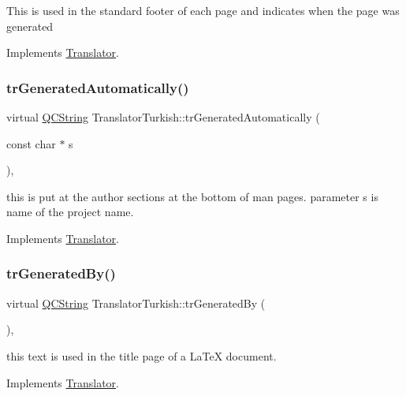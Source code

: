 This is used in the standard footer of each page and indicates when the page was generated 

Implements \mbox{\hyperlink{class_translator}{Translator}}.

\mbox{\label{class_translator_turkish_ad36a09979a5d0f76039f16830424aa11}} 
\subsubsection{\texorpdfstring{trGeneratedAutomatically()}{trGeneratedAutomatically()}}
{\footnotesize\ttfamily virtual \mbox{\hyperlink{class_q_c_string}{Q\+C\+String}} Translator\+Turkish\+::tr\+Generated\+Automatically (\begin{DoxyParamCaption}\item[{const char $\ast$}]{s }\end{DoxyParamCaption})\hspace{0.3cm}{\ttfamily [inline]}, {\ttfamily [virtual]}}

this is put at the author sections at the bottom of man pages. parameter s is name of the project name. 

Implements \mbox{\hyperlink{class_translator}{Translator}}.

\mbox{\label{class_translator_turkish_ad85a8fe1fa1203b404182a18c442422a}} 
\subsubsection{\texorpdfstring{trGeneratedBy()}{trGeneratedBy()}}
{\footnotesize\ttfamily virtual \mbox{\hyperlink{class_q_c_string}{Q\+C\+String}} Translator\+Turkish\+::tr\+Generated\+By (\begin{DoxyParamCaption}{ }\end{DoxyParamCaption})\hspace{0.3cm}{\ttfamily [inline]}, {\ttfamily [virtual]}}

this text is used in the title page of a La\+TeX document. 

Implements \mbox{\hyperlink{class_translator}{Translator}}.

